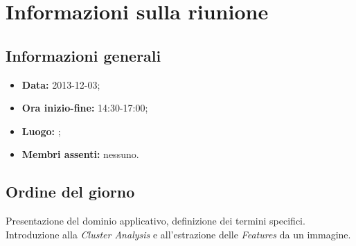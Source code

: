 \section{Informazioni sulla riunione}
\label{inforiunione}
\subsection{Informazioni generali}
\label{infogenerali}
\begin{itemize}
\item\textbf{Data:} 2013-12-03;
\item\textbf{Ora inizio-fine:} 14:30-17:00;
\item\textbf{Luogo:} \proposerName;
\item\textbf{Membri assenti:} nessuno.
\end{itemize}

\subsection{Ordine del giorno}
\label{odg}
Presentazione del dominio applicativo, definizione dei termini specifici. Introduzione alla \textit{Cluster Analysis}\glossario{} e all'estrazione delle \textit{Features}\glossario{} da un immagine.